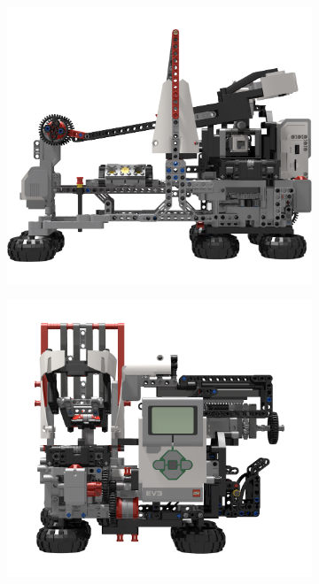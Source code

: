 \documentclass{report}
\begin{document}
    \begin{figure}[H]
    	\centering
    	\begin{subfigure}[b]{0.275\textwidth}
    		\includegraphics[width=\textwidth]{Resources/Images/rdrMkIIElevation1.png}
    		\caption{}
    		\label{fig:rdrMkIIElevation1}
    	\end{subfigure}
    	\hspace{10mm}
    	\begin{subfigure}[b]{0.275\textwidth}
    		\includegraphics[width=\textwidth]{Resources/Images/rdrMkIIElevation2.png}

\end{subfigure}
\end{figure}
\end{document}
